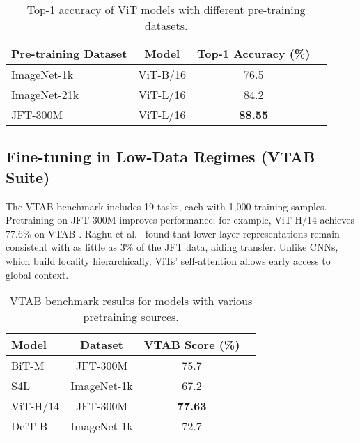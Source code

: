 \documentclass[conference]{IEEEtran}
\begin{document}
\begin{table}[ht]
    \centering
    \caption{Top-1 accuracy of ViT models with different pre-training datasets.}
    \begin{tabular}{lccc}
        \hline
        \textbf{Pre-training Dataset} & \textbf{Model} & \textbf{Top-1 Accuracy (\%)} \\ \hline
        ImageNet-1k                   & ViT-B/16       & 76.5                         \\
        ImageNet-21k                  & ViT-L/16       & 84.2                         \\
        JFT-300M                      & ViT-L/16       & \textbf{88.55}               \\ \hline
    \end{tabular}
\end{table}

\subsection{Fine-tuning in Low-Data Regimes (VTAB Suite)}

The VTAB benchmark includes 19 tasks, each with 1,000 training samples. Pretraining on JFT-300M improves performance; for example, ViT-H/14 achieves 77.6\% on VTAB \cite{zhai2022scaling}. Raghu et al.~\cite{raghu2021vision} found that lower-layer representations remain consistent with as little as 3\% of the JFT data, aiding transfer. Unlike CNNs, which build locality hierarchically, ViTs' self-attention allows early access to global context.

\begin{table}[ht]
    \centering
    \caption{VTAB benchmark results for models with various pretraining sources.}
    \begin{tabular}{lccc}
        \hline
        \textbf{Model} & \textbf{Dataset} & \textbf{VTAB Score (\%)} \\ \hline
        BiT-M          & JFT-300M         & 75.7                     \\
        S4L            & ImageNet-1k      & 67.2                     \\
        ViT-H/14       & JFT-300M         & \textbf{77.63}           \\
        DeiT-B         & ImageNet-1k      & 72.7                     \\ \hline
    \end{tabular}
\end{table}
\end{document}
